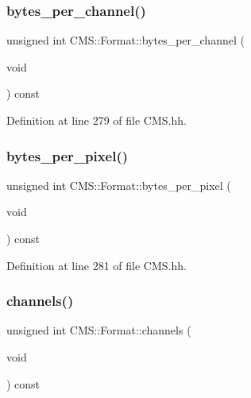 \subsubsection{\texorpdfstring{bytes\+\_\+per\+\_\+channel()}{bytes\_per\_channel()}}
{\footnotesize\ttfamily unsigned int C\+M\+S\+::\+Format\+::bytes\+\_\+per\+\_\+channel (\begin{DoxyParamCaption}\item[{void}]{ }\end{DoxyParamCaption}) const\hspace{0.3cm}{\ttfamily [inline]}}



Definition at line 279 of file C\+M\+S.\+hh.

\mbox{\label{class_c_m_s_1_1_format_a9079b22fbbf174c43f395f290ed4cd71}} 
\subsubsection{\texorpdfstring{bytes\+\_\+per\+\_\+pixel()}{bytes\_per\_pixel()}}
{\footnotesize\ttfamily unsigned int C\+M\+S\+::\+Format\+::bytes\+\_\+per\+\_\+pixel (\begin{DoxyParamCaption}\item[{void}]{ }\end{DoxyParamCaption}) const\hspace{0.3cm}{\ttfamily [inline]}}



Definition at line 281 of file C\+M\+S.\+hh.

\mbox{\label{class_c_m_s_1_1_format_a3c58f7bf8ac3d880c0610672e2c2c4de}} 
\subsubsection{\texorpdfstring{channels()}{channels()}}
{\footnotesize\ttfamily unsigned int C\+M\+S\+::\+Format\+::channels (\begin{DoxyParamCaption}\item[{void}]{ }\end{DoxyParamCaption}) const\hspace{0.3cm}{\ttfamily [inline]}}



